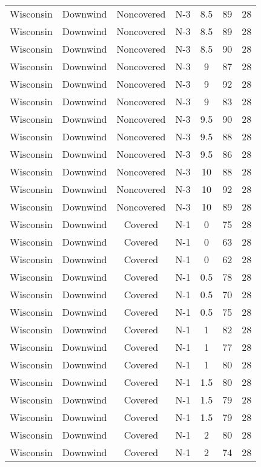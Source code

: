 \documentclass{article}
\begin{document}
\begin{longtable}[H]{ccccccc}
Wisconsin & Downwind & Noncovered & N-3 & 8.5  & 89  & 28 \\
Wisconsin & Downwind & Noncovered & N-3 & 8.5  & 89  & 28 \\
Wisconsin & Downwind & Noncovered & N-3 & 8.5  & 90  & 28 \\
Wisconsin & Downwind & Noncovered & N-3 & 9    & 87  & 28 \\
Wisconsin & Downwind & Noncovered & N-3 & 9    & 92  & 28 \\
Wisconsin & Downwind & Noncovered & N-3 & 9    & 83  & 28 \\
Wisconsin & Downwind & Noncovered & N-3 & 9.5  & 90  & 28 \\
Wisconsin & Downwind & Noncovered & N-3 & 9.5  & 88  & 28 \\
Wisconsin & Downwind & Noncovered & N-3 & 9.5  & 86  & 28 \\
Wisconsin & Downwind & Noncovered & N-3 & 10   & 88  & 28 \\
Wisconsin & Downwind & Noncovered & N-3 & 10   & 92  & 28 \\
Wisconsin & Downwind & Noncovered & N-3 & 10   & 89  & 28 \\
Wisconsin & Downwind & Covered     & N-1 & 0    & 75  & 28 \\
Wisconsin & Downwind & Covered     & N-1 & 0    & 63  & 28 \\
Wisconsin & Downwind & Covered     & N-1 & 0    & 62  & 28 \\
Wisconsin & Downwind & Covered     & N-1 & 0.5  & 78  & 28 \\
Wisconsin & Downwind & Covered     & N-1 & 0.5  & 70  & 28 \\
Wisconsin & Downwind & Covered     & N-1 & 0.5  & 75  & 28 \\
Wisconsin & Downwind & Covered     & N-1 & 1    & 82  & 28 \\
Wisconsin & Downwind & Covered     & N-1 & 1    & 77  & 28 \\
Wisconsin & Downwind & Covered     & N-1 & 1    & 80  & 28 \\
Wisconsin & Downwind & Covered     & N-1 & 1.5  & 80  & 28 \\
Wisconsin & Downwind & Covered     & N-1 & 1.5  & 79  & 28 \\
Wisconsin & Downwind & Covered     & N-1 & 1.5  & 79  & 28 \\
Wisconsin & Downwind & Covered     & N-1 & 2    & 80  & 28 \\
Wisconsin & Downwind & Covered     & N-1 & 2    & 74  & 28 \\

\end{longtable}
\end{document}
